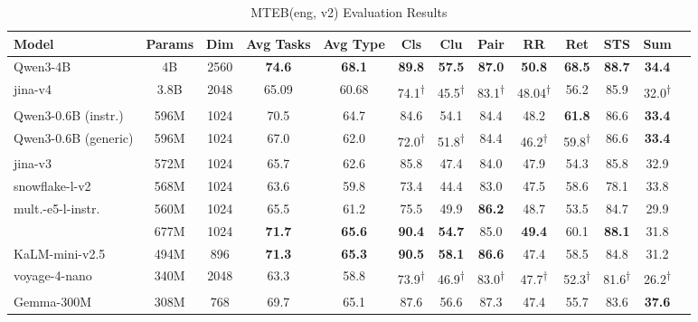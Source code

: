 \documentclass[11pt]{article}
\begin{document}
\begin{table}[t]
\caption{MTEB(eng, v2) Evaluation Results}
\label{tab:mteb_eng_v2}
\centering
\small
\setlength{\tabcolsep}{2pt}
\begin{tabular}{@{}lcccccccccccc@{}}
\toprule
\textbf{Model} & \textbf{Params} & \textbf{Dim} & \textbf{Avg Tasks} & \textbf{Avg Type} & \textbf{Cls} & \textbf{Clu} & \textbf{Pair} & \textbf{RR} & \textbf{Ret} & \textbf{STS} & \textbf{Sum} \\
\midrule
Qwen3-4B                     & 4B    & 2560 & \textbf{74.6} & \textbf{68.1} & \textbf{89.8} & \textbf{57.5} & \textbf{87.0} & \textbf{50.8} & \textbf{68.5} & \textbf{88.7} & \textbf{34.4} \\
jina-v4                    & 3.8B  & 2048 & 65.09   & 60.68   & 74.1\textsuperscript{†} & 45.5\textsuperscript{†} & 83.1\textsuperscript{†} & 48.04\textsuperscript{†}   & 56.2 & 85.9 & 32.0\textsuperscript{†} \\
\midrule
Qwen3-0.6B (instr.)                 & 596M  & 1024 & 70.5 & 64.7 & 84.6 & 54.1 & 84.4 & 48.2 & \textbf{61.8} & 86.6 & \textbf{33.4} \\
Qwen3-0.6B (generic)                  & 596M  & 1024 & 67.0 & 62.0 & 72.0\textsuperscript{†} & 51.8\textsuperscript{†} & 84.4 & 46.2\textsuperscript{†} & 59.8\textsuperscript{†} & 86.6 & \textbf{33.4} \\
jina-v3                    & 572M  & 1024 & 65.7 & 62.6 & 85.8 & 47.4 & 84.0 & 47.9 & 54.3 & 85.8 & 32.9 \\
snowflake-l-v2              & 568M  & 1024 & 63.6 & 59.8 & 73.4 & 44.4 & 83.0 & 47.5 & 58.6 & 78.1 & 33.8 \\
mult.-e5-l-instr.         & 560M  & 1024 & 65.5 & 61.2 & 75.5 & 49.9 & \textbf{86.2} & 48.7 & 53.5 & 84.7 & 29.9 \\
\JEmbeddingVFiveTextSmallShort{}         & 677M  & 1024 & \textbf{71.7} & \textbf{65.6} & \textbf{90.4} & \textbf{54.7} & 85.0 & \textbf{49.4} & 60.1 & \textbf{88.1} & 31.8 \\
\midrule
KaLM-mini-v2.5 & 494M  & 896  & \textbf{71.3} & \textbf{65.3} & \textbf{90.5} & \textbf{58.1} & \textbf{86.6} & 47.4 & 58.5 & 84.8 & 31.2 \\
voyage-4-nano                           & 340M  & 2048 & 63.3 & 58.8 & 73.9\textsuperscript{†} & 46.9\textsuperscript{†} & 83.0\textsuperscript{†} & 47.7\textsuperscript{†} & 52.3\textsuperscript{†} & 81.6\textsuperscript{†} & 26.2\textsuperscript{†} \\
Gemma-300M                   & 308M  & 768  & 69.7 & 65.1 & 87.6 & 56.6 & 87.3 & 47.4 & 55.7 & 83.6 & \textbf{37.6} \\

\end{tabular}
\end{table}
\end{document}
